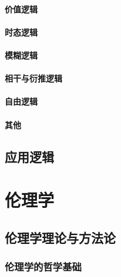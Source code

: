 \documentclass[UTF8]{../RepresentationUniverse}
\begin{document}
    \subsubsection{价值逻辑}
    \subsubsection{时态逻辑}
    \subsubsection{模糊逻辑}
    \subsubsection{相干与衍推逻辑}
    \subsubsection{自由逻辑}
    \subsubsection{其他}
\section{应用逻辑}





\chapter{伦理学}
\section{伦理学理论与方法论}
    \subsection{伦理学的哲学基础}
\end{document}
